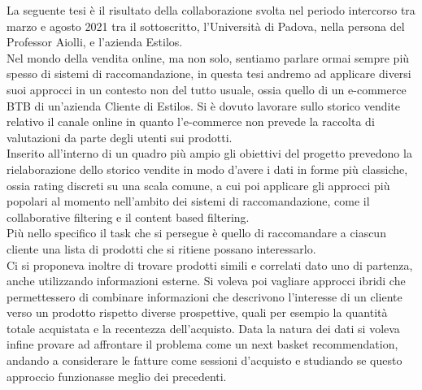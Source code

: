 
La seguente tesi è il risultato della collaborazione svolta nel periodo intercorso tra marzo e agosto 2021 tra il sottoscritto, l'Università di Padova, nella persona del Professor Aiolli, e l'azienda Estilos.\\
Nel mondo della vendita online, ma non solo, sentiamo parlare ormai sempre più spesso di sistemi di raccomandazione, in questa tesi andremo ad applicare diversi suoi approcci in un contesto non del tutto usuale, ossia quello di un e-commerce BTB di un'azienda Cliente di Estilos. 
Si è dovuto lavorare sullo storico vendite relativo il canale online in quanto l'e-commerce non prevede la raccolta di valutazioni da parte degli utenti sui prodotti.\\
Inserito all'interno di un quadro più ampio gli obiettivi del progetto prevedono la rielaborazione dello storico vendite in modo d'avere i dati in forme più classiche, ossia rating discreti su una scala comune, a cui poi applicare gli approcci più popolari al momento nell'ambito dei sistemi di raccomandazione, come il collaborative filtering e il content based filtering.\\
Più nello specifico il task che si persegue è quello di raccomandare a ciascun cliente una lista di prodotti che si ritiene possano interessarlo.\\
Ci si proponeva inoltre di trovare prodotti simili e correlati dato uno di partenza, anche utilizzando informazioni esterne. Si voleva poi vagliare approcci ibridi che permettessero di combinare informazioni che descrivono l'interesse di un cliente verso un prodotto rispetto diverse prospettive, quali per esempio la quantità totale acquistata e la recentezza dell'acquisto. Data la natura dei dati si voleva infine provare ad affrontare il problema come un next basket recommendation, andando a considerare le fatture come sessioni d'acquisto e studiando se questo approccio funzionasse meglio dei precedenti.